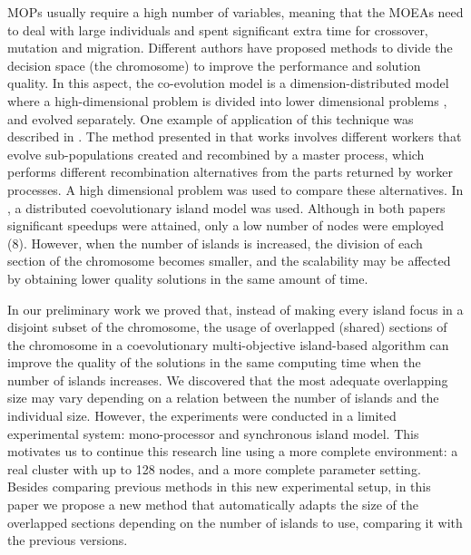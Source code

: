 \documentclass[preprint]{elsarticle}
\begin{document}
MOPs usually require a high number of variables, meaning that the MOEAs need to deal with large individuals and spent significant extra time for crossover, mutation and migration. Different authors have proposed methods to divide the decision space (the chromosome) to improve the performance and solution quality. In this aspect, the co-evolution model is a dimension-distributed model where a high-dimensional problem is divided into lower dimensional problems \citep{Gong15models,Tonda12cooperative}, and evolved separately. One example of application of this technique was described in \citep{Kimovski15Parallel}. The method presented in that works involves different workers that evolve sub-populations created and recombined by a master process, which performs different recombination alternatives from the parts returned by worker processes. A high dimensional problem was used to compare these
alternatives. In \citep{Dorronsoro13superlinear}, a distributed
coevolutionary island model was used.  Although in both papers
significant speedups were attained, only a low number of nodes were
employed (8). However, when the number of islands is increased, the division
of each section of the chromosome becomes smaller, and the scalability
may be affected by obtaining lower quality solutions in the same
amount of time. 









In our preliminary work \citep{Garcia16hpmoon} we proved
that,  instead of making every island focus in a disjoint subset of the
chromosome, the usage of overlapped (shared) sections of the
chromosome in a coevolutionary multi-objective island-based algorithm
can improve the quality of the solutions in the same computing time
when the number of islands increases. We discovered that the most
adequate overlapping size may vary depending on a relation between the
number of islands and the individual size. However, the experiments
were conducted in a limited experimental system: mono-processor and synchronous island model. This
motivates us to continue this research line using a more complete environment: a real cluster with up to 128 nodes, and a more complete parameter setting. Besides comparing previous methods in this new experimental setup, in this paper we propose
a new method that automatically adapts the size of the overlapped
sections depending on the number of islands to use, comparing it with the previous versions. 
\end{document}
